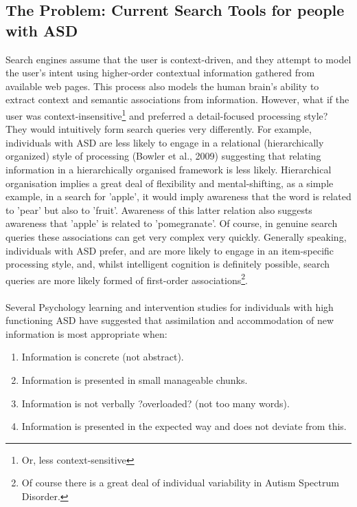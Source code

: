 \documentclass[10pt]{article}
\begin{document}
\subsection{The Problem: Current Search Tools for people with ASD} \label{problem}
Search engines assume that the user is context-driven, and they attempt to model the user's intent using higher-order contextual information gathered from available web pages. This process also models the human brain's ability to extract context and semantic associations from information. However, what if the user was context-insensitive\footnote{Or, less context-sensitive}  and preferred a detail-focused processing style? They would intuitively form search queries very differently. For example, individuals with ASD are less likely to engage in a relational (hierarchically organized) style of processing (Bowler et al., 2009) suggesting that relating information in a hierarchically organised framework is less likely. Hierarchical organisation implies a great deal of flexibility and mental-shifting, as a simple example, in a search for 'apple', it would imply awareness that the word is related to 'pear' but also to 'fruit'. Awareness of this latter relation also suggests awareness that 'apple' is related to 'pomegranate'. Of course, in genuine search queries these associations can get very complex very quickly. Generally speaking, individuals with ASD prefer, and are more likely to engage in an item-specific processing style, and, whilst intelligent cognition is definitely possible, search queries are more likely formed of first-order associations\footnote{Of course there is a great deal of individual variability in Autism Spectrum Disorder.}. \\
\\Several Psychology learning and intervention studies for individuals with high functioning ASD have suggested that assimilation and accommodation of new information is most appropriate when:\\
\begin{enumerate}
\item Information is concrete (not abstract).\\
\item Information is presented in small manageable chunks.\\
\item Information is not verbally ?overloaded? (not too many words).\\
\item Information is presented in the expected way and does not deviate from this.\\
\end{enumerate}
\end{document}
